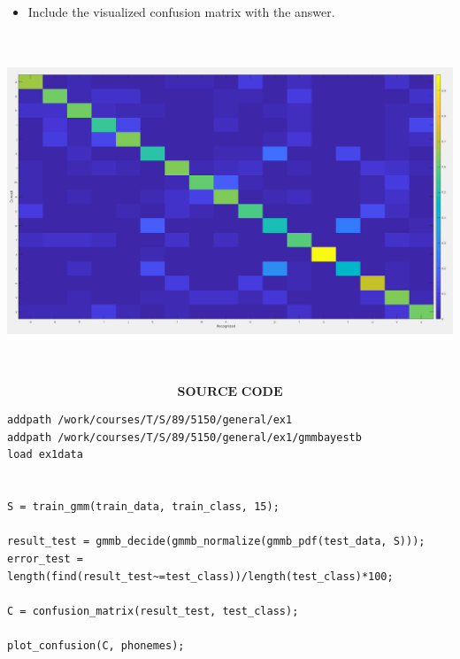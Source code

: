 \documentclass[17pt]{article}
\begin{document}
\begin{itemize}
	\item{Include the visualized confusion matrix with the answer.}
\end{itemize}
\begin{center}
	\includegraphics[width=18cm, height=10cm]{confusion_matrix.png}
\end{center}


\begin{align}
\textbf{SOURCE CODE}
\end{align}

\begin{lstlisting}
addpath /work/courses/T/S/89/5150/general/ex1
addpath /work/courses/T/S/89/5150/general/ex1/gmmbayestb
load ex1data


S = train_gmm(train_data, train_class, 15);

result_test = gmmb_decide(gmmb_normalize(gmmb_pdf(test_data, S)));
error_test = length(find(result_test~=test_class))/length(test_class)*100;

C = confusion_matrix(result_test, test_class);

plot_confusion(C, phonemes);
\end{lstlisting}
\end{document}
